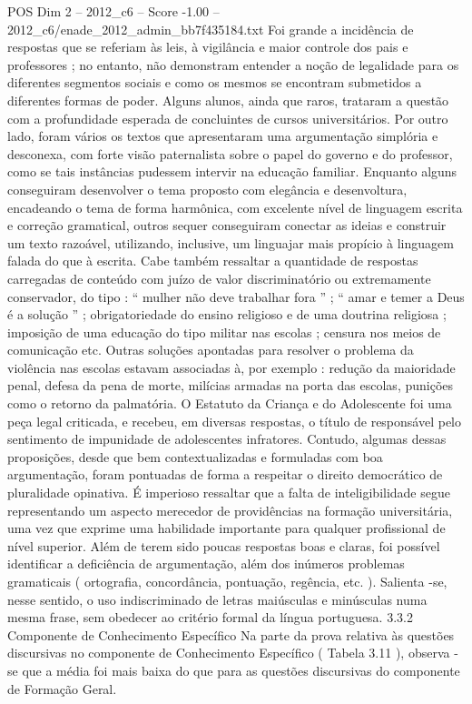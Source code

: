 \begin{textsample}{POS Dim 2 – 2012\_c6 – Score -1.00 – 2012\_c6/enade\_2012\_admin\_bb7f435184.txt}
Foi grande a incidência de respostas que se referiam às leis, à vigilância e maior controle dos pais e professores ; no entanto, não demonstram entender a noção de legalidade para os diferentes segmentos sociais e como os mesmos se encontram submetidos a diferentes formas de poder.
Alguns alunos, ainda que raros, trataram a questão com a profundidade esperada de concluintes de cursos universitários.
Por outro lado, foram vários os textos que apresentaram uma argumentação simplória e desconexa, com forte visão paternalista sobre o papel do governo e do professor, como se tais instâncias pudessem intervir na educação familiar.
Enquanto alguns conseguiram desenvolver o tema proposto com elegância e desenvoltura, encadeando o tema de forma harmônica, com excelente nível de linguagem escrita e correção gramatical, outros sequer conseguiram conectar as ideias e construir um texto razoável, utilizando, inclusive, um linguajar mais propício à linguagem falada do que à escrita.
Cabe também ressaltar a quantidade de respostas carregadas de conteúdo com juízo de valor discriminatório ou extremamente conservador, do tipo : “ mulher não deve trabalhar fora ” ; “ amar e temer a Deus é a solução ” ; obrigatoriedade do ensino religioso e de uma doutrina religiosa ; imposição de uma educação do tipo militar nas escolas ; censura nos meios de comunicação etc.
Outras soluções apontadas para resolver o problema da violência nas escolas estavam associadas à, por exemplo : redução da maioridade penal, defesa da pena de morte, milícias armadas na porta das escolas, punições como o retorno da palmatória.
O Estatuto da Criança e do Adolescente foi uma peça legal criticada, e recebeu, em diversas respostas, o título de responsável pelo sentimento de impunidade de adolescentes infratores.
Contudo, algumas dessas proposições, desde que bem contextualizadas e formuladas com boa argumentação, foram pontuadas de forma a respeitar o direito democrático de pluralidade opinativa.
É imperioso ressaltar que a falta de inteligibilidade segue representando um aspecto merecedor de providências na formação universitária, uma vez que exprime uma habilidade importante para qualquer profissional de nível superior.
Além de terem sido poucas respostas boas e claras, foi possível identificar a deficiência de argumentação, além dos inúmeros problemas gramaticais ( ortografia, concordância, pontuação, regência, etc. ).
Salienta -se, nesse sentido, o uso indiscriminado de letras maiúsculas e minúsculas numa mesma frase, sem obedecer ao critério formal da língua portuguesa. 3.3.2 Componente de Conhecimento Específico Na parte da prova relativa às questões discursivas no componente de Conhecimento Específico ( Tabela 3.11 ), observa -se que a média foi mais baixa do que para as questões discursivas do componente de Formação Geral.

\end{textsample}
